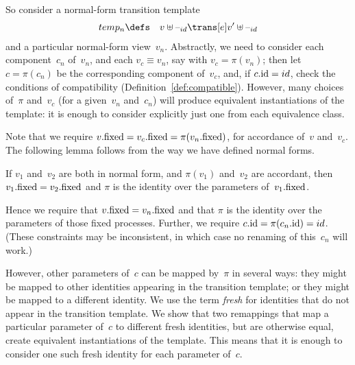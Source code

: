 So consider a normal-form transition template
\begin{eqnarray*}
temp_n & \defs &  v \uplus \hole{id} \trans[e] v' \uplus \hole{id}
\end{eqnarray*}
and a particular normal-form view~$v_n$.  
%
Abstractly, we need to consider each component~$c_n$ of~$v_n$, and each $v_c
\equiv v_n$, say with $v_c = \pi(v_n)$; then let $c = \pi(c_n)$ be the
corresponding component of~$v_c$, and, if $c.\mathrm{id} = id$, check the conditions
of compatibility (Definition~\ref{def:compatible}).  However, many choices
of~$\pi$ and~$v_c$ (for a given~$v_n$ and~$c_n$) will produce equivalent
instantiations of the template: it is enough to consider explicitly just one
from each equivalence class.

Note that we require $v.\mathrm{fixed} = v_c.\mathrm{fixed} = \pi(v_n.\mathrm{fixed})$, for accordance
of~$v$ and~$v_c$.  The following lemma follows from the way we have defined
normal forms.
%
\begin{lemma}
\label{lem:remapping-id-on-fixed-params}
If $v_1$ and~$v_2$ are both in normal form, and $\pi(v_1)$ and~$v_2$ are
accordant, then $v_1.\mathrm{fixed} = v_2.\mathrm{fixed}$ and $\pi$ is the identity over the
parameters of~$v_1.\mathrm{fixed}$.
\end{lemma}
%
Hence we require that $v.\mathrm{fixed} = v_n.\mathrm{fixed}$ and that $\pi$ is the identity
over the parameters of those fixed processes.  Further, we require $c.\mathrm{id} =
\pi(c_n.\mathrm{id}) = id$.  (These constraints may be inconsistent, in which case no
renaming of this~$c_n$ will work.)

However, other parameters of~$c$ can be mapped by~$\pi$ in several
ways: they might be mapped to other identities appearing in the transition
template; or they might be mapped to a different identity.  We use the term
\emph{fresh} for identities that do not appear in the transition template.  We
show that two remappings that map a particular parameter of~$c$ to different
fresh identities, but are otherwise equal, create equivalent instantiations of
the template.  This means that it is enough to consider one such fresh
identity for each parameter of~$c$. 




